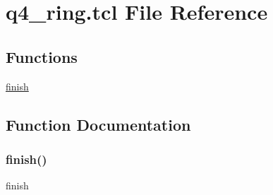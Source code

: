 \hypertarget{q4__ring_8tcl}{}\section{q4\+\_\+ring.\+tcl File Reference}
\label{q4__ring_8tcl}
\subsection*{Functions}
\begin{DoxyCompactItemize}
\item 
\hyperlink{q4__ring_8tcl_a30728837c246b65ef76298af0101d99c}{finish}
\end{DoxyCompactItemize}


\subsection{Function Documentation}
\mbox{\label{q4__ring_8tcl_a30728837c246b65ef76298af0101d99c}} 
\subsubsection{\texorpdfstring{finish()}{finish()}}
{\footnotesize\ttfamily finish}

